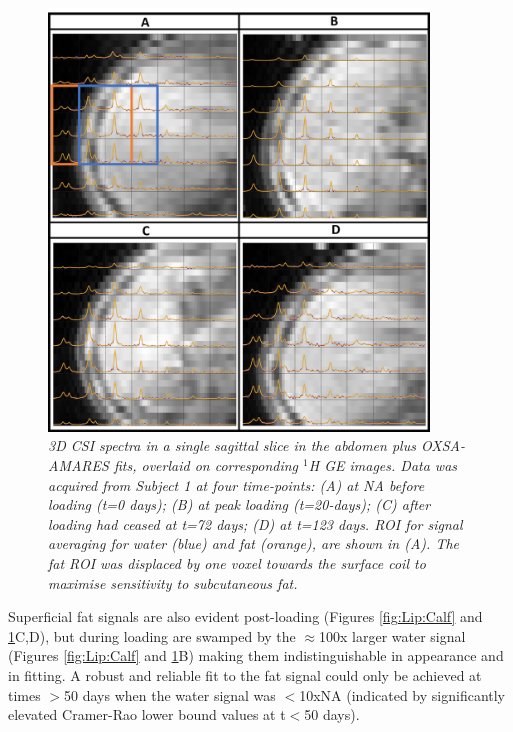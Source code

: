 \documentclass[class=article, crop=false]{standalone}
\begin{document}
\begin{figure}
    \centering
    \includegraphics[width=0.9\textwidth]{Figures/Lipid/Abdomen.png}
    \caption{\textit{3D CSI spectra in a single sagittal slice in the abdomen plus OXSA-AMARES fits, overlaid on corresponding $^1$H GE images. Data was acquired from Subject 1 at four time-points: (A) at NA before loading (t=0 days); (B) at peak loading (t=20-days); (C) after loading had ceased at t=72 days; (D) at t=123 days. ROI for signal averaging for water (blue) and fat (orange), are shown in (A). The fat ROI was displaced by one voxel towards the surface coil to maximise sensitivity to subcutaneous fat.}}
    \label{fig:Lip:Abdomen}
\end{figure}

Superficial fat signals are also evident post-loading (Figures \ref{fig:Lip:Calf} and \ref{fig:Lip:Abdomen}C,D), but during loading are swamped by the $\approx$100x larger water signal (Figures \ref{fig:Lip:Calf} and \ref{fig:Lip:Abdomen}B) making them indistinguishable in appearance and in fitting. A robust and reliable fit to the fat signal could only be achieved at times $>$50 days when the water signal was $<$10xNA (indicated by significantly elevated Cramer-Rao lower bound values at t$<$50 days).
\end{document}
